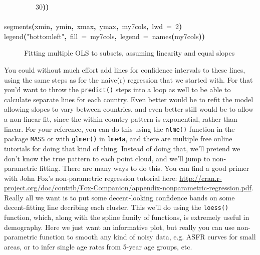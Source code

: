 \documentclass[a4paper]{article}
\newcommand{\hlnumber}[1]{\textcolor[rgb]{0.0823529411764706,0.0784313725490196,0.709803921568627}{#1}}%
\newcommand{\hlfunctioncall}[1]{\textcolor[rgb]{1,0,0}{#1}}%
\newcommand{\hlstring}[1]{\textcolor[rgb]{0.6,0.6,1}{#1}}%
\newcommand{\hlkeyword}[1]{\textcolor[rgb]{0,0,0}{\textbf{#1}}}%
\newcommand{\hlargument}[1]{\textcolor[rgb]{0.694117647058824,0.247058823529412,0.0196078431372549}{#1}}%
\newcommand{\hlsymbol}[1]{\textcolor[rgb]{0,0,0}{#1}}%
\newcommand{\hlprompt}[1]{\textcolor[rgb]{0,0,0}{#1}}%
\newcommand{\hlstd}[1]{\textcolor[rgb]{0,0,0}{#1}}%
\newenvironment{Houtput}{\raggedright}{%
%
}
\begin{document}
\begin{Houtput}
\hlstd{}\hlprompt{{\ }}{\ }{\ }{\ }{\ }{\ }{\ }{\ }{\ }\hlnumber{30}\hlkeyword{)}\hlkeyword{)}\hspace*{\fill}\\
\hlstd{}\hlprompt{{\ }}\hlkeyword{\usebox{\hlnormalsizeboxclosebrace}}\mbox{}
\normalfont
\hspace*{\fill}\\
\hlstd{}\ttfamily\noindent
\hlprompt{\usebox{\hlnormalsizeboxgreaterthan}{\ }}\hlfunctioncall{segments}\hlkeyword{(}\hlsymbol{xmin}\hlkeyword{,}{\ }\hlsymbol{ymin}\hlkeyword{,}{\ }\hlsymbol{xmax}\hlkeyword{,}{\ }\hlsymbol{ymax}\hlkeyword{,}{\ }\hlsymbol{my7cols}\hlkeyword{,}{\ }\hlargument{lwd}{\ }\hlargument{=}{\ }\hlnumber{2}\hlkeyword{)}\mbox{}
\normalfont
\hspace*{\fill}\\
\hlstd{}\ttfamily\noindent
\hlprompt{\usebox{\hlnormalsizeboxgreaterthan}{\ }}\hlfunctioncall{legend}\hlkeyword{(}\hlstring{"bottomleft"}\hlkeyword{,}{\ }\hlargument{fill}{\ }\hlargument{=}{\ }\hlsymbol{my7cols}\hlkeyword{,}{\ }\hlargument{legend}{\ }\hlargument{=}{\ }\hlfunctioncall{names}\hlkeyword{(}\hlsymbol{my7cols}\hlkeyword{)}\hlkeyword{)}\mbox{}
\normalfont
\hspace*{\fill}\\
\hlstd{}
\end{Houtput}
\begin{figure}[H]
\centering

{\tikzexternaldisable

}
\caption{Fitting multiple OLS to subsets, assuming linearity and equal slopes}
\end{figure}

You could without much effort add lines for confidence intervals to these lines, using the same steps as for the naive(r) regression that we started with. For that you'd want to throw the \texttt{predict()} steps into a loop as well to be able to calculate separate lines for each country. Even better would be to refit the model allowing slopes to vary between countries, and even better still would be to allow a non-linear fit, since the within-country pattern is exponential, rather than linear. For your reference, you can do this using the \texttt{nlme()} function in the package \texttt{MASS} or with \texttt{glmer()} in \texttt{lme4a}, and there are multiple free online tutorials for doing that kind of thing. Instead of doing that, we'll pretend we don't know the true pattern to each point cloud, and we'll jump to non-parametric fitting. There are many ways to do this. You can find a good primer with John Fox's non-parametric regression tutorial here: \url{http://cran.r-project.org/doc/contrib/Fox-Companion/appendix-nonparametric-regression.pdf}. Really all we want is to put some decent-looking confidence bands on some decent-fitting line decribing each cluster. This we'll do using the \texttt{loess()} function, which, along with the spline family of functions, is extremely useful in demography. Here we just want an informative plot, but really you can use non-parametric function to smooth any kind of noisy data,  e.g. ASFR curves for small areas, or to infer single age rates from 5-year age groups, etc.\\
\end{document}
